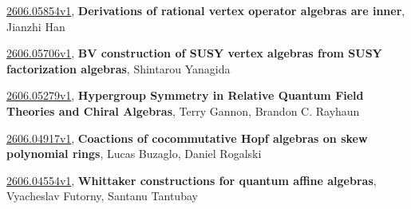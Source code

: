 \documentclass[9pt, a4paper]{article}
\theoremstyle{plain}
\theoremstyle{definition}
\theoremstyle{remark}
\newcommand{\arxiv}[3]{\href{https://arxiv.org/abs/#1}{#1}, \textbf{\textcolor{arxivblue}{#2}}, #3}
\begin{document}
\arxiv{2606.05854v1}{Derivations of rational vertex operator algebras are inner}{Jianzhi Han}

\arxiv{2606.05706v1}{BV construction of SUSY vertex algebras from SUSY factorization algebras}{Shintarou Yanagida}

\arxiv{2606.05279v1}{Hypergroup Symmetry in Relative Quantum Field Theories and Chiral Algebras}{Terry Gannon, Brandon C. Rayhaun}

\arxiv{2606.04917v1}{Coactions of cocommutative Hopf algebras on skew polynomial rings}{Lucas Buzaglo, Daniel Rogalski}

\arxiv{2606.04554v1}{Whittaker constructions for quantum affine algebras}{Vyacheslav Futorny, Santanu Tantubay}

\end{document}
